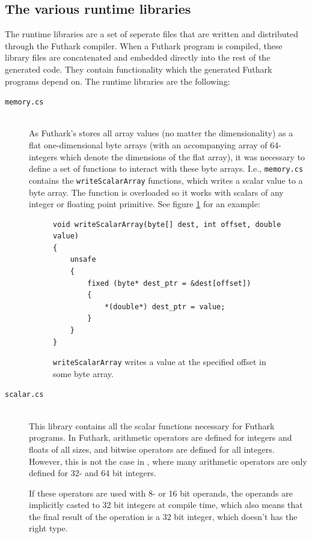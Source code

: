 \subsection*{The various runtime libraries}
The runtime libraries are a set of seperate \csharp{} files that are written and
distributed through the Futhark compiler. When a Futhark program is compiled,
these library files are concatenated and embedded directly into the rest of the
generated code. They contain functionality which the generated Futhark programs
depend on.
The runtime libraries are the following:
\begin{description}
\item[\texttt{memory.cs}] \hfill\\
  As Futhark's stores all array values (no matter the dimensionality) as a flat one-dimensional byte arrays (with an accompanying
  array of 64-integers which denote the dimensions of the flat array), it was
  necessary to define a set of functions to interact with these byte arrays.
  I.e., \texttt{memory.cs} contains the \texttt{writeScalarArray} functions,
  which writes a scalar value to a byte array. The function is overloaded so it
  works with scalars of any integer or floating point primitive. See figure
  \ref{fig:writeScalarArray} for an example:

\begin{figure}[h]
\centering
\begin{verbatim}
void writeScalarArray(byte[] dest, int offset, double value)
{
    unsafe
    {
        fixed (byte* dest_ptr = &dest[offset])
        {
            *(double*) dest_ptr = value;
        }
    }
}
\end{verbatim}
\caption{\texttt{writeScalarArray} writes a value at the specified offset in
some byte array.}
\label{fig:writeScalarArray}
\end{figure}

\item[\texttt{scalar.cs}] \hfill\\
  This library contains all the scalar functions necessary for Futhark \csharp{}
  programs.
  In Futhark, arithmetic operators are defined for integers and floats of all
  sizes, and bitwise operators are defined for all integers.
  However, this is not the case in \csharp{}, where many arithmetic operators
  are only defined for 32- and 64 bit integers.
  
  If these operators are used with 8- or 16 bit operands, the operands are
  implicitly casted to 32 bit integers at compile time, which also means that
  the final result of the operation is a 32 bit integer, which doesn't has the
  right type.


\end{description}
